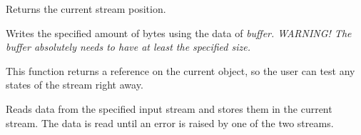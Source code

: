 

Returns the current stream position.



Writes the specified amount of bytes using the data of \it{buffer}. 
\it{WARNING!} The buffer absolutely needs to have at least the specified size.

This function returns a reference on the current object, so the user can test
any states of the stream right away.


Reads data from the specified input stream and stores them 
in the current stream. The data is read until an error is raised
by one of the two streams.

